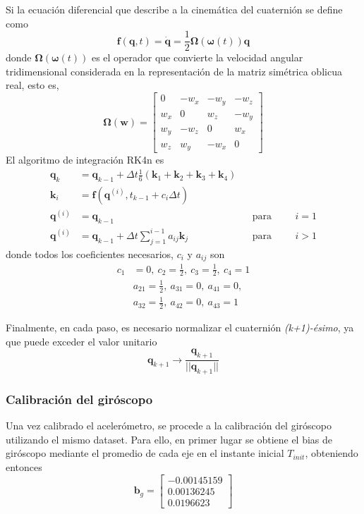 Si la ecuación diferencial que describe a la cinemática del cuaternión se define como
\begin{equation}
    \bm{f}(\bm{q},t) = \dot{\bm{q}} = \frac{1}{2}\bm{\Omega}(\bm{\omega}(t))\bm{q}
\end{equation}
donde $\bm{\Omega}(\bm{\omega}(t))$ es el operador que convierte la velocidad angular tridimensional considerada en la representación de la matriz simétrica oblicua real, esto es,
\begin{equation}
    \bm{\Omega}(\bm{w}) = 
    \begin{bmatrix}
        0 & -w_x & -w_y & -w_z \\
        w_x & 0 & w_z & -w_y \\
        w_y & -w_z & 0 & w_x \\
        w_z & w_y & -w_x & 0
    \end{bmatrix}
\end{equation}
El algoritmo de integración RK4n es
\begin{align}
    \bm{q}_{k} &= \bm{q}_{k-1} + \Delta t\frac{1}{6}(\bm{k}_1 +\bm{k}_2 + \bm{k}_3 + \bm{k}_4) \\
    \bm{k}_i &= \bm{f}(\bm{q}^{(i)},t_{k-1}+c_i\Delta t) \\
    \bm{q}^{(i)} &= \bm{q}_{k-1} &&\text{para} &&&i=1 \\
    \bm{q}^{(i)} &= \bm{q}_{k-1} + \Delta t\sum_{j=1}^{i-1}a_{ij}\bm{k}_j &&\text{para} &&&i>1
\end{align}
donde todos los coeficientes necesarios, $c_i$ y $a_{ij}$ son
\begin{align*}
    c_1 &= 0,\ c_2 = \frac{1}{2},\ c_3 = \frac{1}{2},\ c_4 = 1 \\
    &a_{21} = \frac{1}{2},\ a_{31} = 0,\ a_{41} = 0, \\
    &a_{32} = \frac{1}{2},\ a_{42} = 0,\ a_{43} = 1
\end{align*}

Finalmente, en cada paso, es necesario normalizar el cuaternión \textit{(k+1)-ésimo}, ya que puede exceder el valor unitario
\begin{equation}
    \bm{q}_{k+1} \rightarrow \frac{\bm{q}_{k+1}}{||\bm{q}_{k+1}||}
\end{equation}

\subsubsection{Calibración del giróscopo}
Una vez calibrado el acelerómetro, se procede a la calibración del giróscopo utilizando el mismo dataset. Para ello, en primer lugar se obtiene el bias de giróscopo mediante el promedio de cada eje en el instante inicial $T_{init}$, obteniendo entonces
\begin{equation}
    \bm{b}_g =
    \begin{bmatrix}
         -0.00145159 \\
         0.00136245 \\
         0.0196623
    \end{bmatrix}
\end{equation}

